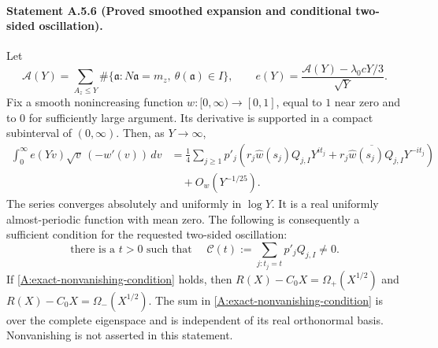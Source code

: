 \paragraph{Statement A.5.6 (Proved smoothed expansion and conditional two-sided oscillation).}
Let
\[
 \mathcal A(Y)=\sum_{A_z\leq Y}
       \#\{\mathfrak a:N\mathfrak a=m_z,\ \theta(\mathfrak a)\in I\},
 \qquad e(Y)=\frac{\mathcal A(Y)-\lambda_0cY/3}{\sqrt Y}.
\]
Fix a smooth nonincreasing function $w:[0,\infty)\to[0,1]$,
equal to $1$ near zero and to $0$ for sufficiently large argument.
Its derivative is supported in a compact subinterval of $(0,\infty)$.
Then, as $Y\to\infty$,
\begin{align}\label{A:fixed-smoothing-AP}
 \int_0^\infty e(Yv)\sqrt v\,(-w'(v))\,dv
 &=\frac14\sum_{j\geq1}p'_j
 \left(r_j\widehat w(s_j)Q_{j,I}Y^{it_j}
 +\overline{r_j\widehat w(s_j)Q_{j,I}}Y^{-it_j}\right)
 \nonumber\\
 &\quad+O_w(Y^{-1/25}).
\end{align}
The series converges absolutely and uniformly in $\log Y$.
It is a real uniformly almost-periodic function with mean zero.
The following is consequently a sufficient condition for the
requested two-sided oscillation:
\begin{equation}\label{A:exact-nonvanishing-condition}
 \text{there is a }t>0\text{ such that }\quad
 \mathcal C(t):=\sum_{j:t_j=t}p'_jQ_{j,I}\ne0.
\end{equation}
If \eqref{A:exact-nonvanishing-condition} holds, then
$R(X)-C_0X=\Omega_+(X^{1/2})$ and
$R(X)-C_0X=\Omega_-(X^{1/2})$.
The sum in \eqref{A:exact-nonvanishing-condition} is over the
complete eigenspace and is independent of its real orthonormal
basis. Nonvanishing is not asserted in this statement.

